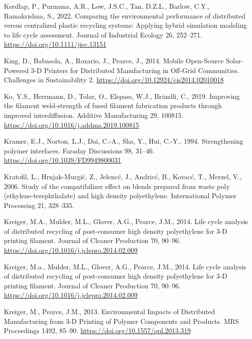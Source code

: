 \documentclass[
  12pt,
  number,
  review]{elsarticle}
\newlength{\cslhangindent}
\newlength{\cslentryspacingunit} %
\newenvironment{CSLReferences}[2] %
 {%
  \setlength{\parindent}{0pt}
  \ifodd #1
  \let\oldpar\par
  \def\par{\hangindent=\cslhangindent\oldpar}
  \fi
  \setlength{\parskip}{#2\cslentryspacingunit}
 }%
 {}
\begin{document}
\begin{CSLReferences}{1}{0}
\leavevmode{}%
Kerdlap, P., Purnama, A.R., Low, J.S.C., Tan, D.Z.L., Barlow, C.Y.,
Ramakrishna, S., 2022. Comparing the environmental performance of
distributed versus centralized plastic recycling systems: {Applying}
hybrid simulation modeling to life cycle assessment. Journal of
Industrial Ecology 26, 252--271.
\url{https://doi.org/10.1111/jiec.13151}

\leavevmode{}%
King, D., Babasola, A., Rozario, J., Pearce, J., 2014. Mobile
{Open-Source Solar-Powered} 3-{D Printers} for {Distributed
Manufacturing} in {Off-Grid Communities}. Challenges in Sustainability
2. \url{https://doi.org/10.12924/cis2014.02010018}

\leavevmode{}%
Ko, Y.S., Herrmann, D., Tolar, O., Elspass, W.J., Brändli, C., 2019.
Improving the filament weld-strength of fused filament fabrication
products through improved interdiffusion. Additive Manufacturing 29,
100815. \url{https://doi.org/10.1016/j.addma.2019.100815}

\leavevmode{}%
Kramer, E.J., Norton, L.J., Dai, C.-A., Sha, Y., Hui, C.-Y., 1994.
Strengthening polymer interfaces. Faraday Discussions 98, 31--46.
\url{https://doi.org/10.1039/FD9949800031}

\leavevmode{}%
Kratofil, L., Hrnjak-Murgić, Z., Jelencć, J., Andricć, B., Kovacć, T.,
Merzel, V., 2006. Study of the compatibilizer effect on blends prepared
from waste poly (ethylene-terephthalate) and high density polyethylene.
International Polymer Processing 21, 328--335.

\leavevmode{}%
Kreiger, M.A., Mulder, M.L., Glover, A.G., Pearce, J.M., 2014. Life
cycle analysis of distributed recycling of post-consumer high density
polyethylene for 3-{D} printing filament. Journal of Cleaner Production
70, 90--96. \url{https://doi.org/10.1016/j.jclepro.2014.02.009}

\leavevmode{}%
Kreiger, M.a., Mulder, M.L., Glover, A.G., Pearce, J.M., 2014. Life
cycle analysis of distributed recycling of post-consumer high density
polyethylene for 3-{D} printing filament. Journal of Cleaner Production
70, 90--96. \url{https://doi.org/10.1016/j.jclepro.2014.02.009}

\leavevmode{}%
Kreiger, M., Pearce, J.M., 2013. Environmental {Impacts} of {Distributed
Manufacturing} from 3-{D Printing} of {Polymer Components} and
{Products}. MRS Proceedings 1492, 85--90.
\url{https://doi.org/10.1557/opl.2013.319}


\end{CSLReferences}
\end{document}
